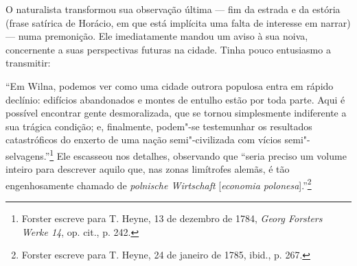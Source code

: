 O naturalista transformou sua observação última --- fim da estrada e da
estória (frase satírica de Horácio, em que está implícita uma falta de
interesse em narrar) --- numa premonição. Ele imediatamente mandou um
aviso à sua noiva, concernente a suas perspectivas futuras na cidade.
Tinha pouco entusiasmo a transmitir:

%

``Em Wilna, podemos ver como uma cidade outrora populosa entra em rápido
declínio: edifícios abandonados e montes de entulho estão por toda
parte. Aqui é possível encontrar gente desmoralizada, que se tornou
simplesmente indiferente a sua trágica condição; e, finalmente, podem"-se
testemunhar os resultados catastróficos do enxerto de uma nação
semi"-civilizada com vícios semi"-selvagens.''\footnote{Forster escreve
  para T. Heyne, 13 de dezembro de 1784, \emph{Georg Forsters Werke 14},
  op. cit., p. 242.} Ele escasseou nos detalhes, observando que ``seria
preciso um volume inteiro para descrever aquilo que, nas zonas
limítrofes alemãs, é tão engenhosamente chamado de \emph{polnische
Wirtschaft} {[}\emph{economia polonesa}{]}.''\footnote{Forster escreve
  para T. Heyne, 24 de janeiro de 1785, ibid., p. 267.}

